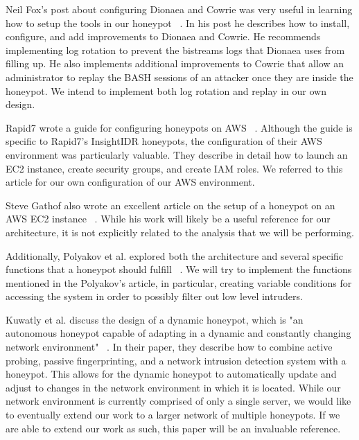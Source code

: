 %
Neil Fox's post about configuring Dionaea and Cowrie was very useful in learning how to setup the tools in our honeypot ~\cite{Fox}. In his post he describes how to install, configure, and add improvements to Dionaea and Cowrie. He recommends implementing log rotation to prevent the bistreams logs that Dionaea uses from filling up. He also implements additional improvements to Cowrie that allow an administrator to replay the BASH sessions of an attacker once they are inside the honeypot. We intend to implement both log rotation and replay in our own design.

Rapid7 wrote a guide for configuring honeypots on AWS ~\cite{Rapid7}. Although the guide is specific to Rapid7's InsightIDR honeypots, the configuration of their AWS environment was particularly valuable. They describe in detail how to launch an EC2 instance, create security groups, and create IAM roles. We referred to this article for our own configuration of our AWS environment. 

Steve Gathof also wrote an excellent article on the setup of a honeypot on an AWS EC2 instance ~\cite{Gathof}. While his work will likely be a useful reference for our architecture, it is not explicitly related to the analysis that we will be performing. 

Additionally, Polyakov et al. explored both the architecture and several specific functions that a honeypot should fulfill ~\cite{Polyakov2018ArchitectureOT}. We will try to implement the functions mentioned in the Polyakov's article, in particular, creating variable conditions for accessing the system in order to possibly filter out low level intruders.

Kuwatly et al. discuss the design of a dynamic honeypot, which is "an autonomous honeypot capable of adapting in a dynamic and constantly changing network environment" ~\cite{Dynamic}. In their paper, they describe how to combine active probing, passive fingerprinting, and a network intrusion detection system with a honeypot. This allows for the dynamic honeypot to automatically update and adjust to changes in the network environment in which it is located. While our network environment  is currently comprised of only a single server, we would like to eventually extend our work to a larger network of multiple honeypots. If we are able to extend our work as such, this paper will be an invaluable reference. 